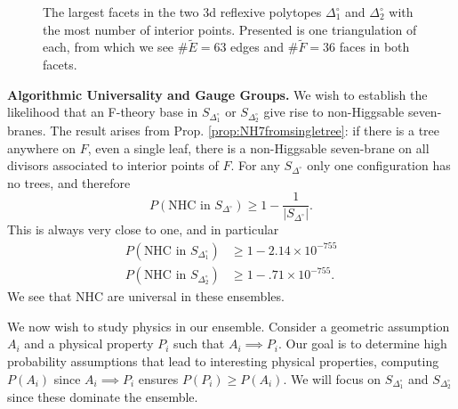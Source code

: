 \documentclass[aps,prl,twocolumn, superscriptaddress,groupedaddress,nofootinbib]{revtex4-1}
\newcommand{\sdoc}{S_{\Delta_1^\circ}}
\newcommand{\sdtc}{S_{\Delta_2^\circ}}
\begin{document}
\begin{figure}[t]
\caption{The largest facets in the two 3d reflexive polytopes $\Delta_1^\circ$ and $\Delta_2^\circ$
with the most number of interior points. Presented is one triangulation of each,
from which we see $\#\tilde E=63$ edges and $\#\tilde F=36$ faces in both facets.}
\label{fig:bigfacetbigone1}
\end{figure}

\vspace{.2cm}
\noindent \textbf{Algorithmic Universality and Gauge Groups.} We wish to establish
the likelihood that an F-theory base in $\sdoc$ or $\sdtc$ give rise to
non-Higgsable seven-branes. The result arises from Prop. \ref{prop:NH7fromsingletree}:
if there is a tree anywhere on $F$, even a single leaf, there is a
non-Higgsable seven-brane on all divisors associated to interior points of $F$.
For any $S_{\Delta^\circ}$ only one configuration has no trees, and therefore
\begin{equation}
P(\text{NHC in } S_{\Delta^\circ}) \geq 1 - \frac{1}{|S_{\Delta^\circ}|}.
\end{equation}
This is always very close to one, and in particular
\begin{align}
P(\text{NHC in } \sdoc) &\geq1-2.14\times 10^{-755} \nonumber \\
P(\text{NHC in } \sdtc) &\geq 1-.71\times 10^{-755}.
\end{align}
We see that NHC are universal in these ensembles.

We now wish to study physics in
our ensemble. Consider a geometric assumption $A_i$
and a physical property $P_i$ such that $A_i\implies P_i$. Our goal is to determine high
probability assumptions that lead to interesting physical properties, computing $P(A_i)$
since $A_i\implies P_i$ ensures $P(P_i)\geq P(A_i).$ We will focus on $\sdoc$ and $\sdtc$ since
these dominate the ensemble.
\end{document}

